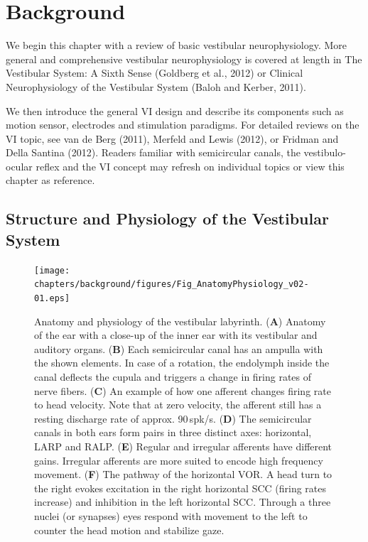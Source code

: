 \chapter{Background}\label{chap:background}
We begin this chapter with a review of basic vestibular neurophysiology. More general and comprehensive vestibular neurophysiology is covered at length in The Vestibular System: A Sixth Sense (Goldberg et al., 2012) or Clinical Neurophysiology of the Vestibular System (Baloh and Kerber, 2011). 

We then introduce the general VI design and describe its components such as motion sensor, electrodes and stimulation paradigms. For detailed reviews on the VI topic, see van de Berg (2011), Merfeld and Lewis (2012), or Fridman and Della Santina (2012). Readers familiar with semicircular canals, the vestibulo-ocular reflex and the VI concept may refresh on individual topics or view this chapter as reference.

\section{Structure and Physiology of the Vestibular System}\label{sec:background:physio}
\begin{figure}[btp]
\centering
\texttt{[image: chapters/background/figures/Fig\_AnatomyPhysiology\_v02-01.eps]} 
\caption[Anatomy and physiology of the vestibular labyrinth]{Anatomy and physiology of the vestibular labyrinth. (\textbf{A}) Anatomy of the ear with a close-up of the inner ear with its vestibular and auditory organs. (\textbf{B}) Each semicircular canal has an ampulla with the shown elements. In case of a rotation, the endolymph inside the canal deflects the cupula and triggers a change in firing rates of nerve fibers. (\textbf{C}) An example of how one afferent changes firing rate to head velocity. Note that at zero velocity, the afferent still has a resting discharge rate of approx. 90\,spk/s. (\textbf{D}) The semicircular canals in both ears form pairs in three distinct axes: horizontal, LARP and RALP. (\textbf{E}) Regular and irregular afferents have different gains. Irregular afferents are more suited to encode high frequency movement. (\textbf{F}) The pathway of the horizontal VOR. A head turn to the right evokes excitation in the right horizontal SCC (firing rates increase) and inhibition in the left horizontal SCC. Through a three nuclei (or synapses) eyes respond with movement to the left to counter the head motion and stabilize gaze.
}
\label{fig:anatomy}
\end{figure}


